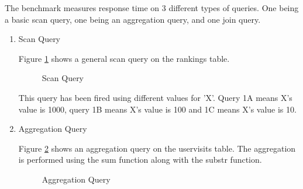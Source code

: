 \documentclass[9pt,twocolumn,twoside]{../../styles/osajnl}
\begin{document}
\noindent
The benchmark measures response time on 3 different types of
queries. One being a basic scan query, one being an aggregation query,
and one join query.
\begin{enumerate}
  
\item Scan Query

Figure \ref{fig:scanquery} shows a general scan query on the rankings
table.
 
\begin{figure}[htbp]
\centering
{}
\caption{\cite{www-benchmarks-bigguery} Scan Query}
\label{fig:scanquery}
\end{figure}

This query has been fired using different values for 'X'. Query 1A
means X's value is 1000, query 1B means X's value is 100 and 1C means
X's value is 10.

\item Aggregation Query

Figure \ref{fig:aggregationquery} shows an aggregation query on the
uservisits table. The aggregation is performed using the sum function
along with the substr function.
 
\begin{figure}[htbp]
\centering
{}
\caption{\cite{www-benchmarks-bigguery} Aggregation Query}
\label{fig:aggregationquery}
\end{figure}


\end{enumerate}
\end{document}
